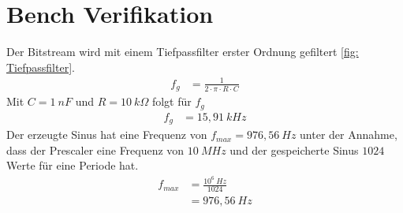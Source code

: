 \documentclass[./\jobname.tex]{subfiles}
\begin{document}
\section{Bench Verifikation}
%
Der Bitstream wird mit einem Tiefpassfilter erster Ordnung gefiltert \autoref{fig: Tiefpassfilter}.
%
\begin{align}
f_{g}&= \frac{1}{2 \cdot \pi \cdot R \cdot C}
\end{align}
%
Mit \(C=1~nF\) und \(R=10~k\Omega\) folgt für \(f_{g}\)
%
\begin{align}
	f_{g}&= 15,91~kHz
\end{align}
%
Der erzeugte Sinus hat eine Frequenz von \(f_{max}=976,56~Hz\) unter der Annahme, dass der Prescaler eine Frequenz von \(10~MHz\) und der gespeicherte Sinus \(1024\) Werte für eine Periode hat.
%
\begin{align}
f_{max}&=\frac{10^{6}~Hz}{1024}\\
&=976,56~Hz
\end{align}
%
\def\bildA{false}
\begin{figure}[H]
	\centering
	\noindent{}
	\label{fig: Tiefpassfilter}
\end{figure}
%
\begin{figure}[H]
	\centering
	\noindent{}
	\label{fig: oszi_dutytrack}
\end{figure}
%
\begin{figure}[H]
	\centering
	\noindent{}
	\label{fig: ramp.png}
\end{figure}
%
\begin{figure}[H]
	\centering
	\noindent{}
	\label{fig: triangle.png}
\end{figure}
%
\begin{figure}[H]
	\centering
	\noindent{}
	\label{fig: square.png}
\end{figure}
%
\end{document}
